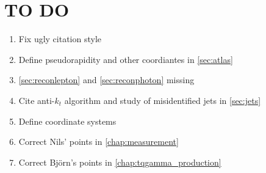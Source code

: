 \chapter{TO DO}
\begin{enumerate}
    \item Fix ugly citation style
    \item Define pseudorapidity and other coordiantes in \ref{sec:atlas}
    \item \ref{sec:reconlepton} and \ref{sec:reconphoton} missing
    \item Cite anti-$k_t$ algorithm and study of misidentified jets in \ref{sec:jets}
    \item Define coordinate systems
    \item Correct Nils' points in \ref{chap:measurement}
    \item Correct Björn's points in \ref{chap:tqgamma_production}
\end{enumerate}